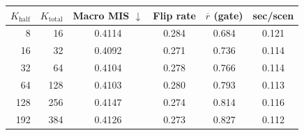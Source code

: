 \begin{tabular}{rrcccc}\toprule
$K_\text{half}$ & $K_\text{total}$ & Macro MIS $\downarrow$ & Flip rate & $\overline{r}$ (gate) & sec/scen \\\midrule
8 & 16 & 0.4114 & 0.284 & 0.684 & 0.121 \\
16 & 32 & 0.4092 & 0.271 & 0.736 & 0.114 \\
32 & 64 & 0.4104 & 0.278 & 0.766 & 0.114 \\
64 & 128 & 0.4103 & 0.280 & 0.793 & 0.113 \\
128 & 256 & 0.4147 & 0.274 & 0.814 & 0.116 \\
192 & 384 & 0.4126 & 0.273 & 0.827 & 0.112 \\
\bottomrule
\end{tabular}